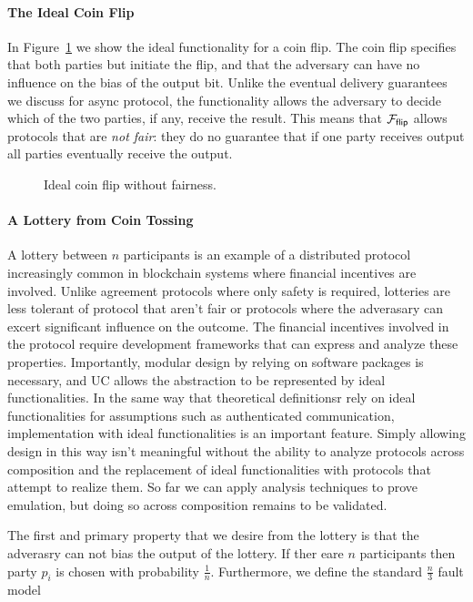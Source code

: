 \paragraph{The Ideal Coin Flip}
In Figure~\ref{fig:fflip} we show the ideal functionality for a coin flip. 
The coin flip specifies that both parties but initiate the flip, and that the adversary can have no influence on the bias of the output bit.
Unlike the eventual delivery guarantees we discuss for async protocol, the functionality allows the adversary to decide which of the two parties, if any, receive the result.
This means that $\mathcal{F}_{{\mathsf {flip}}}$ allows protocols that are \emph{not fair}: they do no guarantee that if one party receives output all parties eventually receive the output. 
\begin{figure}
\centering

\caption{Ideal coin flip without fairness.}
\label{fig:fflip}
\end{figure}

\paragraph{A Lottery from Coin Tossing}
A lottery between $n$ participants is an example of a distributed protocol increasingly common in blockchain systems where financial incentives are involved.
Unlike agreement protocols where only safety is required, lotteries are less tolerant of protocol that aren't fair or protocols where the adverasary can excert significant influence on the outcome. 
The financial incentives involved in the protocol require development frameworks that can express and analyze these properties.
Importantly, modular design by relying on software packages is necessary, and UC allows the abstraction to be represented by ideal functionalities.
In the same way that theoretical definitionsr rely on ideal functionalities for assumptions such as authenticated communication, implementation with ideal functionalities is an important feature.
Simply allowing design in this way isn't meaningful without the ability to analyze protocols across composition and the replacement of ideal functionalities with protocols that attempt to realize them.
So far we can apply analysis techniques to prove emulation, but doing so across composition remains to be validated.

The first and primary property that we desire from the lottery is that the adverasry can not bias the output of the lottery.
If ther eare $n$ participants then party $p_i$ is chosen with probability $\frac{1}{n}$.
Furthermore, we define the standard $\frac{n}{3}$ fault model 

